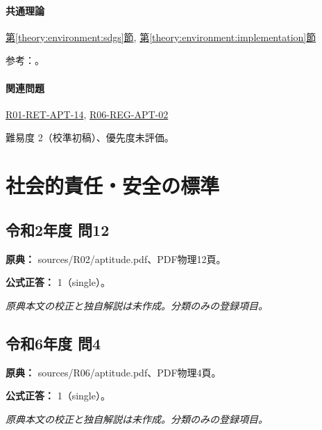 \paragraph{共通理論} \hyperref[theory:environment:sdgs]{第\ref*{theory:environment:sdgs}節}, \hyperref[theory:environment:implementation]{第\ref*{theory:environment:implementation}節}

\par 参考：\cite{env_sdgs_pamphlet,env_humansecurity}。

\paragraph{関連問題} \hyperref[q:r01-ret-apt-14]{R01-RET-APT-14}, \hyperref[q:r06-reg-apt-02]{R06-REG-APT-02}

\par 難易度 2（校準初稿）、優先度未評価。

\section{社会的責任・安全の標準}

\subsection{令和2年度 問12}
\label{q:r02-reg-apt-12}

\noindent\textbf{原典：} sources/R02/aptitude.pdf、PDF物理12頁。

\textbf{公式正答：} 1（single）。

\par\textit{原典本文の校正と独自解説は未作成。分類のみの登録項目。}

\subsection{令和6年度 問4}
\label{q:r06-reg-apt-04}

\noindent\textbf{原典：} sources/R06/aptitude.pdf、PDF物理4頁。

\textbf{公式正答：} 1（single）。

\par\textit{原典本文の校正と独自解説は未作成。分類のみの登録項目。}
